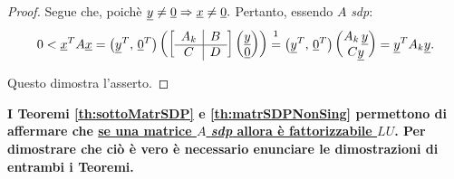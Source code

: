\begin{proof}
    Segue che, poichè $\uline y\neq\uline 0\Rightarrow\uline x\neq\uline 0.$ Pertanto, essendo $A$ \textit{sdp}:
    \begin{equation*}
        0<\uline x^T A\uline x=\left(\uline y^T,\, \uline 0^T\right)\left(\left[\begin{array}{c|c}
            A_k & B\\
            \hline
            C & D
        \end{array}\right]\begin{pmatrix}
            \uline y\\
            \uline 0
        \end{pmatrix}\right) \overset{\footnotemark}{=}\left(\uline y^T,\,\uline 0^T\right) \begin{pmatrix}
            A_k\, \uline y\\
            C\uline y
        \end{pmatrix}=\uline y^T A_k \uline y.
    \end{equation*}

    Questo dimostra l'asserto.
\end{proof}

\addtocounter{footnote}{-1}


\begin{remark}
    \textbf{I Teoremi \ref{th:sottoMatrSDP} e \ref{th:matrSDPNonSing} permettono di affermare che \uline{se una matrice $A$ \textit{sdp} allora è fattorizzabile $LU$}. Per dimostrare che ciò è vero è necessario enunciare le dimostrazioni di entrambi i Teoremi.}
\end{remark}

